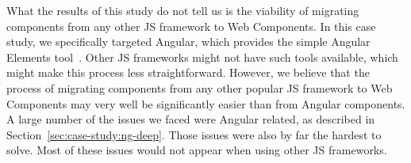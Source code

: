 What the results of this study do not tell us is the viability of migrating components from any other JS framework to Web Components. In this case study, we specifically targeted Angular, which provides the simple Angular Elements tool~. Other JS frameworks might not have such tools available, which might make this process less straightforward. However, we believe that the process of migrating components from any other popular JS framework to Web Components may very well be significantly easier than from Angular components. A large number of the issues we faced were Angular related, as described in Section~\ref{sec:case-study:ng-deep}. Those issues were also by far the hardest to solve. Most of these issues would not appear when using other JS frameworks.
